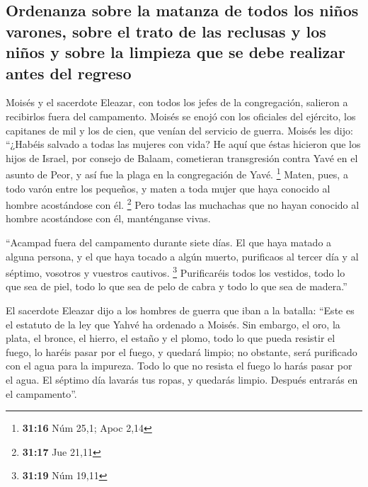 \begin{paracol}{2}
\hypertarget{ordenanza-sobre-la-matanza-de-todos-los-niuxf1os-varones-sobre-el-trato-de-las-reclusas-y-los-niuxf1os-y-sobre-la-limpieza-que-se-debe-realizar-antes-del-regreso}{%
\subsection{Ordenanza sobre la matanza de todos los niños varones, sobre
el trato de las reclusas y los niños y sobre la limpieza que se debe
realizar antes del
regreso}\label{ordenanza-sobre-la-matanza-de-todos-los-niuxf1os-varones-sobre-el-trato-de-las-reclusas-y-los-niuxf1os-y-sobre-la-limpieza-que-se-debe-realizar-antes-del-regreso}}

 Moisés y el sacerdote Eleazar, con todos los jefes de la
congregación, salieron a recibirlos fuera del campamento.
 Moisés se enojó con los oficiales del ejército, los
capitanes de mil y los de cien, que venían del servicio de guerra.
 Moisés les dijo: ``¿Habéis salvado a todas las mujeres
con vida?  He aquí que éstas hicieron que los hijos de
Israel, por consejo de Balaam, cometieran transgresión contra Yavé en el
asunto de Peor, y así fue la plaga en la congregación de Yavé.
\footnote{\textbf{31:16} Núm 25,1; Apoc 2,14}  Maten,
pues, a todo varón entre los pequeños, y maten a toda mujer que haya
conocido al hombre acostándose con él. \footnote{\textbf{31:17} Jue
  21,11}  Pero todas las muchachas que no hayan conocido
al hombre acostándose con él, manténganse vivas.

 ``Acampad fuera del campamento durante siete días. El
que haya matado a alguna persona, y el que haya tocado a algún muerto,
purificaos al tercer día y al séptimo, vosotros y vuestros cautivos.
\footnote{\textbf{31:19} Núm 19,11}  Purificaréis todos
los vestidos, todo lo que sea de piel, todo lo que sea de pelo de cabra
y todo lo que sea de madera.''

 El sacerdote Eleazar dijo a los hombres de guerra que
iban a la batalla: ``Este es el estatuto de la ley que Yahvé ha ordenado
a Moisés.  Sin embargo, el oro, la plata, el bronce, el
hierro, el estaño y el plomo,  todo lo que pueda resistir
el fuego, lo haréis pasar por el fuego, y quedará limpio; no obstante,
será purificado con el agua para la impureza. Todo lo que no resista el
fuego lo harás pasar por el agua.  El séptimo día lavarás
tus ropas, y quedarás limpio. Después entrarás en el campamento''.


\end{paracol}
